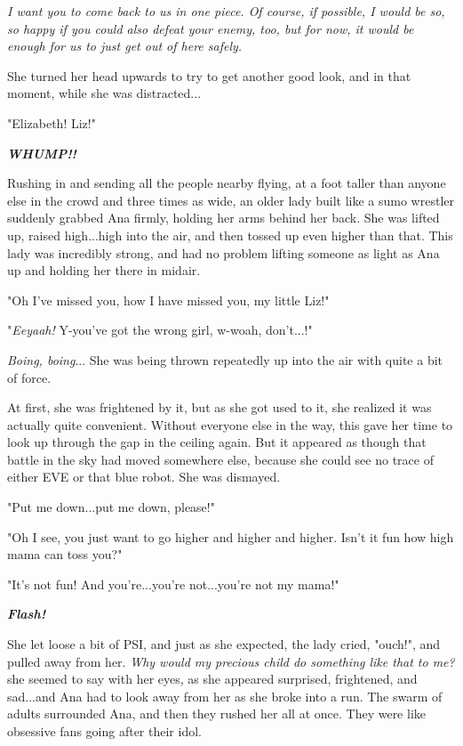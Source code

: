 \documentclass[
]{article}
\begin{document}
\emph{I want you to come back to us in one piece. Of course, if
possible, I would be so, so happy if you could also defeat your enemy,
too, but for now, it would be enough for us to just get out of here
safely.}

She turned her head upwards to try to get another good look, and in that
moment, while she was distracted...

"Elizabeth! Liz!"

\emph{\textbf{WHUMP!!}}

Rushing in and sending all the people nearby flying, at a foot taller
than anyone else in the crowd and three times as wide, an older lady
built like a sumo wrestler suddenly grabbed Ana firmly, holding her arms
behind her back. She was lifted up, raised high...high into the air, and
then tossed up even higher than that. This lady was incredibly strong,
and had no problem lifting someone as light as Ana up and holding her
there in midair.

"Oh I've missed you, how I have missed you, my little Liz!"

"\emph{Eeyaah!} Y-you've got the wrong girl, w-woah, don't...!"

\emph{Boing, boing}... She was being thrown repeatedly up into the air
with quite a bit of force.

At first, she was frightened by it, but as she got used to it, she
realized it was actually quite convenient. Without everyone else in the
way, this gave her time to look up through the gap in the ceiling again.
But it appeared as though that battle in the sky had moved somewhere
else, because she could see no trace of either EVE or that blue robot.
She was dismayed.

"Put me down...put me down, please!"

"Oh I see, you just want to go higher and higher and higher. Isn't it
fun how high mama can toss you?"

"It's not fun! And you're...you're not...you're not my mama!"

\emph{\textbf{Flash!}}

She let loose a bit of PSI, and just as she expected, the lady cried,
"ouch!", and pulled away from her. \emph{Why would my precious child do
something like that to me?} she seemed to say with her eyes, as she
appeared surprised, frightened, and sad...and Ana had to look away from
her as she broke into a run. The swarm of adults surrounded Ana, and
then they rushed her all at once. They were like obsessive fans going
after their idol.
\end{document}
